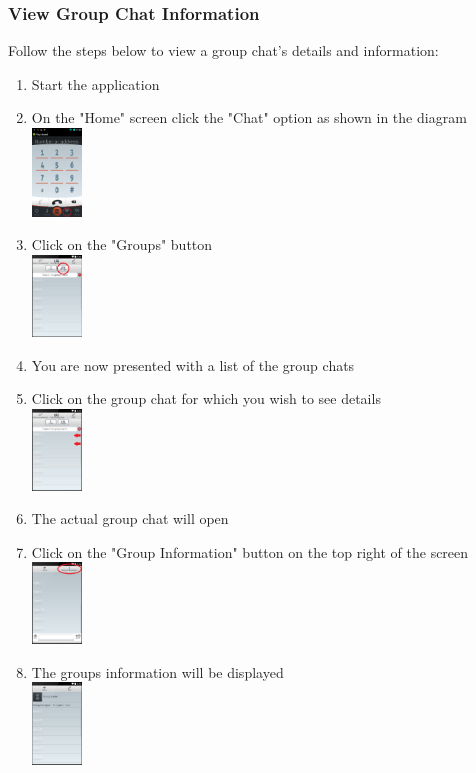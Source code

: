 \documentclass[11pt]{article}
\begin{document}
\subsubsection*{View Group Chat Information}
Follow the steps below to view a group chat's details and information:
\begin{enumerate}
\item Start the application
\item On the "Home" screen click the "Chat" option as shown in the diagram\\
\includegraphics[width=50px]{images/mainScreen.png}
\item Click on the "Groups" button\\
\includegraphics[width=50px]{images/ChatlistNav.png}
\item You are now presented with a list of the group chats
\item Click on the group chat for which you wish to see details\\
\includegraphics[width=50px]{images/Grouplist.png}
\item The actual group chat will open
\item Click on the "Group Information" button on the top right of the screen\\
\includegraphics[width=50px]{images/groupchatInfo.png}
\item The groups information will be displayed\\
\includegraphics[width=50px]{images/groupchatInfoDisp.png}
\end{enumerate}
\end{document}
